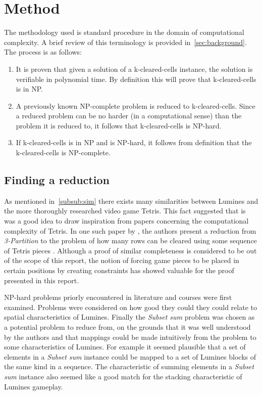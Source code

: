 \section{Method}
\label{method}

The methodology used is standard procedure in the domain of computational complexity. A brief review of this terminology is provided in~\autoref{sec:background}.
The process is as follows:

\begin{enumerate}
\item It is proven that given a solution of a k-cleared-cells instance, the solution is verifiable in polynomial time. By definition this will prove that k-cleared-cells is in NP.
\item A previously known NP-complete problem is reduced to k-cleared-cells. Since a reduced problem can be no harder (in a computational sense) than the problem it is reduced to, it follows that k-cleared-cells is NP-hard.
\item If k-cleared-cells is in NP and is NP-hard, it follows from definition that the k-cleared-cells is NP-complete.
\end{enumerate}

\subsection{Finding a reduction}
As mentioned in~\autoref{subsub:sim} there exists many similarities between Lumines and the more thoroughly researched video game Tetris. This fact suggested that is was a good idea to draw inspiration from papers concerning the computational complexity of Tetris. In one such paper by \citeauthor{tetris}, the authors present a reduction from \textit{3-Partition} to the problem of how many rows can be cleared using some sequence of Tetris pieces \cite{tetris}. Although a proof of similar completeness is considered to be out of the scope of this report, the notion of forcing game pieces to be placed in certain positions by creating constraints has showed valuable for the proof presented in this report.

NP-hard problems priorly encountered in literature and courses were first examined. Problems were considered on how good they could they could relate to spatial characteristics of Lumines. Finally the \textit{Subset sum} problem was chosen as a potential problem to reduce from, on the grounds that it was well understood by the authors and that mappings could be made intuitively from the problem to some characteristics of Lumines. For example it seemed plausible that a set of elements in a \textit{Subset sum} instance could be mapped to a set of Lumines blocks of the same kind in a sequence. The characteristic of summing elements in a \textit{Subset sum} instance also seemed like a good match for the stacking characteristic of Lumines gameplay.
